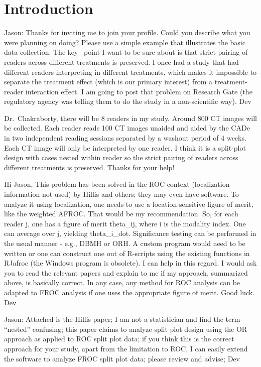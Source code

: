 \documentclass[]{book}
\begin{document}
\hypertarget{introduction-2}{%
\section{Introduction}\label{introduction-2}}

Jason:
Thanks for inviting me to join your profile. Could you describe what you were planning on doing? Please use a simple example that illustrates the basic data collection. The key ~point I want to be sure about is that strict pairing of readers across different treatments is preserved. I once had a study that had different readers interpreting in different treatments, which makes it impossible to separate the treatment effect (which is our primary interest) from a treatment-reader interaction effect. I am going to post that problem on Research Gate (the regulatory agency was telling them to do the study in a non-scientific way). Dev

Dr.~Chakraborty, there will be 8 readers in my study. Around 800 CT images will be collected. Each reader reads 100 CT images unaided and aided by the CADe in two independent reading sessions separated by a washout period of 4 weeks. Each CT image will only be interpreted by one reader. I think it is a split-plot design with cases nested within reader so the strict pairing of readers across different treatments is preserved. Thanks for your help!

Hi Jason,
This problem has been solved in the ROC context (localization information not used) by Hillis and others; they may even have software. To analyze it using localization, one needs to use a location-sensitive figure of merit, like the weighted AFROC. That would be my recommendation. So, for each reader j, one has a figure of merit theta\_ij, where i is the modality index. One can average over j, yielding theta\_i\_dot. Significance testing can be performed in the usual manner - e.g., DBMH or ORH. A custom program would need to be written or one can construct one out of R-scripts using the existing functions in RJafroc (the Windows program is obsolete). I can help in this regard. I would ask you to read the relevant papers and explain to me if my approach, summarized above, is basically correct. In any case, any method for ROC analysis can be adapted to FROC analysis if one uses the appropriate figure of merit. Good luck. Dev

Jason: Attached is the Hillis paper; I am not a statistician and find the term ``nested'' confusing; this paper claims to analyze split plot design using the OR approach as applied to ROC split plot data; if you think this is the correct approach for your study, apart from the limitation to ROC, I can easily extend the software to analyze FROC split plot data; please review and advise; Dev
\end{document}
